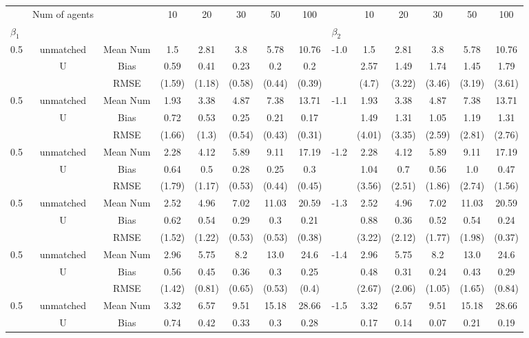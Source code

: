 \begin{tabular}{@{\extracolsep{5pt}}lc|cccccc|lccccc}
\toprule 
 & Num of agents &  & 10 & 20 & 30 & 50 & 100 &  & 10 & 20 & 30 & 50 & 100 \\
$\beta_1$ &  &  &  &  &  &  &  & $\beta_2$ &  &  &  &  &  \\
\midrule 
0.5 & unmatched & Mean Num & 1.5 & 2.81 & 3.8 & 5.78 & 10.76 & -1.0 & 1.5 & 2.81 & 3.8 & 5.78 & 10.76 \\
 & U & Bias & 0.59 & 0.41 & 0.23 & 0.2 & 0.2 &  & 2.57 & 1.49 & 1.74 & 1.45 & 1.79 \\
 &  & RMSE & (1.59) & (1.18) & (0.58) & (0.44) & (0.39) &  & (4.7) & (3.22) & (3.46) & (3.19) & (3.61) \\
0.5 & unmatched & Mean Num & 1.93 & 3.38 & 4.87 & 7.38 & 13.71 & -1.1 & 1.93 & 3.38 & 4.87 & 7.38 & 13.71 \\
 & U & Bias & 0.72 & 0.53 & 0.25 & 0.21 & 0.17 &  & 1.49 & 1.31 & 1.05 & 1.19 & 1.31 \\
 &  & RMSE & (1.66) & (1.3) & (0.54) & (0.43) & (0.31) &  & (4.01) & (3.35) & (2.59) & (2.81) & (2.76) \\
0.5 & unmatched & Mean Num & 2.28 & 4.12 & 5.89 & 9.11 & 17.19 & -1.2 & 2.28 & 4.12 & 5.89 & 9.11 & 17.19 \\
 & U & Bias & 0.64 & 0.5 & 0.28 & 0.25 & 0.3 &  & 1.04 & 0.7 & 0.56 & 1.0 & 0.47 \\
 &  & RMSE & (1.79) & (1.17) & (0.53) & (0.44) & (0.45) &  & (3.56) & (2.51) & (1.86) & (2.74) & (1.56) \\
0.5 & unmatched & Mean Num & 2.52 & 4.96 & 7.02 & 11.03 & 20.59 & -1.3 & 2.52 & 4.96 & 7.02 & 11.03 & 20.59 \\
 & U & Bias & 0.62 & 0.54 & 0.29 & 0.3 & 0.21 &  & 0.88 & 0.36 & 0.52 & 0.54 & 0.24 \\
 &  & RMSE & (1.52) & (1.22) & (0.53) & (0.53) & (0.38) &  & (3.22) & (2.12) & (1.77) & (1.98) & (0.37) \\
0.5 & unmatched & Mean Num & 2.96 & 5.75 & 8.2 & 13.0 & 24.6 & -1.4 & 2.96 & 5.75 & 8.2 & 13.0 & 24.6 \\
 & U & Bias & 0.56 & 0.45 & 0.36 & 0.3 & 0.25 &  & 0.48 & 0.31 & 0.24 & 0.43 & 0.29 \\
 &  & RMSE & (1.42) & (0.81) & (0.65) & (0.53) & (0.4) &  & (2.67) & (2.06) & (1.05) & (1.65) & (0.84) \\
0.5 & unmatched & Mean Num & 3.32 & 6.57 & 9.51 & 15.18 & 28.66 & -1.5 & 3.32 & 6.57 & 9.51 & 15.18 & 28.66 \\
 & U & Bias & 0.74 & 0.42 & 0.33 & 0.3 & 0.28 &  & 0.17 & 0.14 & 0.07 & 0.21 & 0.19 \\

\end{tabular}
